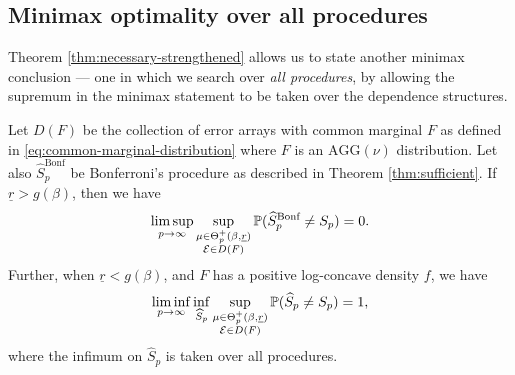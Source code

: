 
\subsection{Minimax optimality over all procedures}
\label{subsec:minimax-over-dependence}

Theorem \ref{thm:necessary-strengthened} allows us to state another minimax conclusion --- one in which we search over \emph{all procedures}, by allowing the supremum in the minimax statement to be taken over the dependence structures. 

\begin{corollary}
\label{cor:minimax-over-dependence}
Let $D(F)$ be the collection of error arrays with common marginal $F$ as defined in \eqref{eq:common-marginal-distribution} where $F$ is an $\text{AGG}(\nu)$ distribution.
Let also $\widehat{S}^{\text{Bonf}}_p$ be Bonferroni's procedure as described in Theorem \ref{thm:sufficient}.
If $\underline{r}>g(\beta)$, then we have
\begin{equation} \label{eq:minimax-over-dependence-over}
    \limsup_{p\to\infty} \sup_{\substack{\mu\in\Theta_p^+(\beta,\underline{r})\\ {\cal E}\in D(F)}} \P(\widehat{S}^{\text{Bonf}}_p \neq S_p) = 0.
\end{equation}
Further, when $\underline{r}<g(\beta)$, and $F$ has a positive log-concave density $f$, we have
\begin{equation} \label{eq:minimax-over-dependence-under}
    \liminf_{p\to\infty} \inf_{\widehat{S}_p} \sup_{\substack{\mu\in\Theta_p^+(\beta,\underline{r})\\ {\cal E}\in D(F)}} \P(\widehat{S}_p \neq S_p) = 
    1,
\end{equation}
where the infimum on $\widehat{S}_p$ is taken over all procedures.
\end{corollary}

